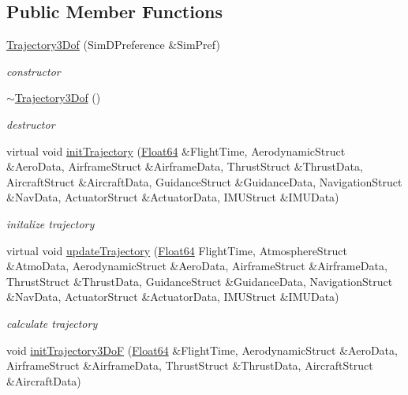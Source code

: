 \subsection*{Public Member Functions}
\begin{DoxyCompactItemize}
\item 
\hyperlink{class_trajectory3_dof_a884cf7d2bb8442fb86584385ee35f679}{Trajectory3\+Dof} (Sim\+D\+Preference \&Sim\+Pref)
\begin{DoxyCompactList}\small\item\em constructor \end{DoxyCompactList}\item 
\hyperlink{class_trajectory3_dof_ab7f3c2605332be2030b923e07112e9c2}{$\sim$\+Trajectory3\+Dof} ()
\begin{DoxyCompactList}\small\item\em destructor \end{DoxyCompactList}\item 
virtual void \hyperlink{class_trajectory3_dof_ab132d729efaded8c7942d462d69cba62}{init\+Trajectory} (\hyperlink{group___tools_ga3f1431cb9f76da10f59246d1d743dc2c}{Float64} \&Flight\+Time, Aerodynamic\+Struct \&Aero\+Data, Airframe\+Struct \&Airframe\+Data, Thrust\+Struct \&Thrust\+Data, Aircraft\+Struct \&Aircraft\+Data, Guidance\+Struct \&Guidance\+Data, Navigation\+Struct \&Nav\+Data, Actuator\+Struct \&Actuator\+Data, I\+M\+U\+Struct \&I\+M\+U\+Data)
\begin{DoxyCompactList}\small\item\em initalize trajectory \end{DoxyCompactList}\item 
virtual void \hyperlink{class_trajectory3_dof_a286d578ad75beaf1018350167557a457}{update\+Trajectory} (\hyperlink{group___tools_ga3f1431cb9f76da10f59246d1d743dc2c}{Float64} Flight\+Time, Atmosphere\+Struct \&Atmo\+Data, Aerodynamic\+Struct \&Aero\+Data, Airframe\+Struct \&Airframe\+Data, Thrust\+Struct \&Thrust\+Data, Guidance\+Struct \&Guidance\+Data, Navigation\+Struct \&Nav\+Data, Actuator\+Struct \&Actuator\+Data, I\+M\+U\+Struct \&I\+M\+U\+Data)
\begin{DoxyCompactList}\small\item\em calculate trajectory \end{DoxyCompactList}\item 
void \hyperlink{class_trajectory3_dof_a8a31fd7c0d76f6f158e62b23f2128f86}{init\+Trajectory3\+DoF} (\hyperlink{group___tools_ga3f1431cb9f76da10f59246d1d743dc2c}{Float64} \&Flight\+Time, Aerodynamic\+Struct \&Aero\+Data, Airframe\+Struct \&Airframe\+Data, Thrust\+Struct \&Thrust\+Data, Aircraft\+Struct \&Aircraft\+Data)

\end{DoxyCompactItemize}
